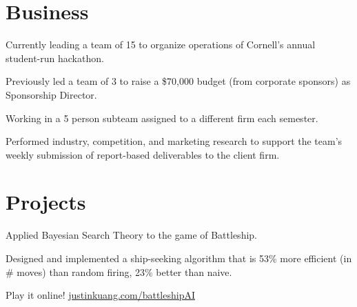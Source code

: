 \documentclass[]{deedy-resume-openfont}
\begin{document}
\begin{minipage}[t]{0.66\textwidth}
\section{Business}

\begin{tightemize}
\item Currently leading a team of 15 to organize operations of Cornell's annual student-run hackathon.
\item Previously led a team of 3 to raise a \$70,000 budget (from corporate sponsors)  as Sponsorship Director.
\end{tightemize}
\sectionsep

\begin{tightemize}
\item Working in a 5 person subteam assigned to a different firm each semester.
\item Performed industry, competition, and marketing research to support the team's weekly submission of report-based deliverables to the client firm.
\end{tightemize}
\sectionsep


\section{Projects}

\begin{tightemize}
\item Applied Bayesian Search Theory to the game of Battleship. 
\item Designed and implemented a ship-seeking algorithm that is 53\% more efficient (in \# moves) than random firing, 23\% better than naive.
\item Play it online! \href{https://justinkuang.com/battleshipAI}{\underline{justinkuang.com/battleshipAI}}

\end{tightemize}
\sectionsep





\end{minipage}
\end{document}
